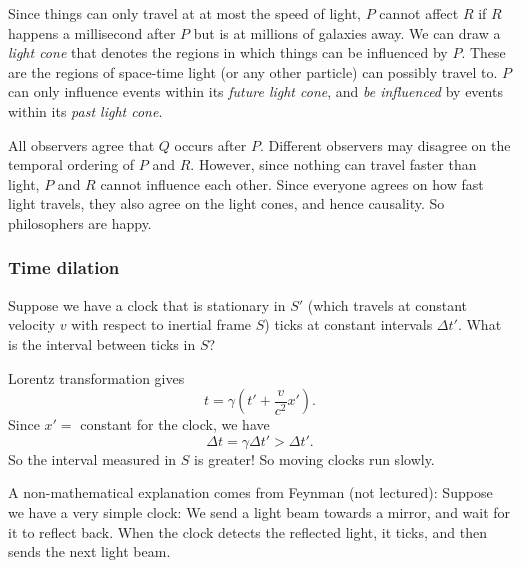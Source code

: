 \documentclass[a4paper]{article}
\begin{document}
Since things can only travel at at most the speed of light, $P$ cannot affect $R$ if $R$ happens a millisecond after $P$ but is at millions of galaxies away. We can draw a \emph{light cone} that denotes the regions in which things can be influenced by $P$. These are the regions of space-time light (or any other particle) can possibly travel to. $P$ can only influence events within its \emph{future light cone}, and \emph{be influenced} by events within its \emph{past light cone}.
\begin{center}
\end{center}
All observers agree that $Q$ occurs after $P$. Different observers may disagree on the temporal ordering of $P$ and $R$. However, since nothing can travel faster than light, $P$ and $R$ cannot influence each other. Since everyone agrees on how fast light travels, they also agree on the light cones, and hence causality. So philosophers are happy.

\subsubsection*{Time dilation}
Suppose we have a clock that is stationary in $S'$ (which travels at constant velocity $v$ with respect to inertial frame $S$) ticks at constant intervals $\Delta t'$. What is the interval between ticks in $S$?

Lorentz transformation gives
\[
  t = \gamma\left(t' + \frac{v}{c^2}x'\right).
\]
Since $x' =$ constant for the clock, we have
\[
  \Delta t = \gamma \Delta t' > \Delta t'.
\]
So the interval measured in $S$ is greater! So moving clocks run slowly.

A non-mathematical explanation comes from Feynman (not lectured): Suppose we have a very simple clock: We send a light beam towards a mirror, and wait for it to reflect back. When the clock detects the reflected light, it ticks, and then sends the next light beam.
\end{document}
